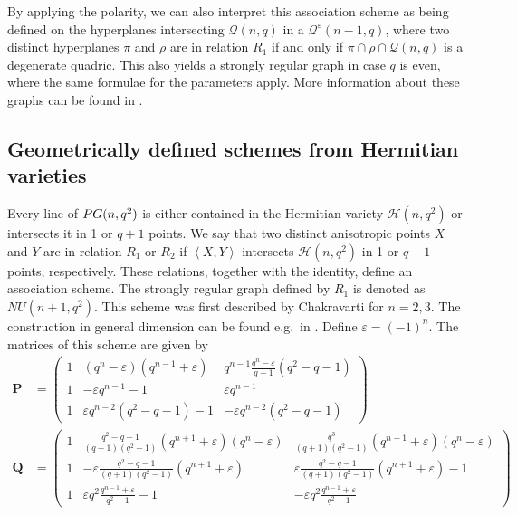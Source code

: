 \documentclass[a4paper]{article}
\theoremstyle{definition}
\newcommand{\eps}{\varepsilon}
\newcommand{\vspan}[1]{\left \langle #1 \right \rangle}
\newcommand{\pg}{\textnormal{PG}}
\newcommand{\mq}{\mathcal Q}
\newcommand{\mh}{\mathcal H}
\begin{document}
By applying the polarity, we can also interpret this association scheme as being defined on the hyperplanes intersecting $\mq(n,q)$ in a $\mq^\eps(n-1,q)$, where two distinct hyperplanes $\pi$ and $\rho$ are in relation $R_1$ if and only if $\pi \cap \rho \cap \mq(n,q)$ is a degenerate quadric.
This also yields a strongly regular graph in case $q$ is even, where the same formulae for the parameters apply.
More information about these graphs can be found in \cite[\S 3.1.4]{brouwervanmaldeghem}.


\subsection{Geometrically defined schemes from Hermitian varieties}
 \label{Sec:NU}

Every line of $\pg(n,q^2)$ is either contained in the Hermitian variety $\mh(n,q^2)$ or intersects it in 1 or $q+1$ points.
We say that two distinct anisotropic points $X$ and $Y$ are in relation $R_1$ or $R_2$ if $\vspan{X,Y}$ intersects $\mh(n,q^2)$ in 1 or $q+1$ points, respectively.
These relations, together with the identity, define an association scheme.
The strongly regular graph defined by $R_1$ is denoted as $NU(n+1,q^2)$.
This scheme was first described by Chakravarti \cite{chakravarti71} for $n = 2,3$.
The construction in general dimension can be found e.g.\ in \cite[\S 3.1.6]{brouwervanmaldeghem}.
Define $\eps = (-1)^n$.
The matrices of this scheme are given by
\begin{align*}
 \mathbf P &= \begin{pmatrix}
  1 & \left( q^n - \eps \right) \left( q^{n-1} + \eps \right) & q^{n-1} \frac{q^n - \eps}{q+1} (q^2-q-1) \\[0.5em]
  1 & - \eps q^{n-1} - 1 & \eps q^{n-1} \\[0.5em]
  1 & \eps q^{n-2} (q^2-q-1) - 1 & -\eps q^{n-2} (q^2-q-1)
 \end{pmatrix} \\
 \mathbf Q & = \begin{pmatrix}
  1 & \frac{q^2-q-1}{(q+1)(q^2-1)}\left( q^{n+1} + \eps \right) \left( q^n - \eps \right) & \frac{q^3}{(q+1)(q^2-1)} \left( q^{n-1} + \eps \right)\left( q^n - \eps \right) \\[0.5em]
  1 & -\eps \frac{q^2-q-1}{(q+1)(q^2-1)}\left( q^{n+1} + \eps \right) & \eps \frac{q^2-q-1}{(q+1)(q^2-1)}\left( q^{n+1} + \eps \right) - 1 \\[0.5em]
  1 & \eps q^2 \frac{q^{n-1} + \eps }{q^2-1} - 1 & - \eps q^2 \frac{q^{n-1} + \eps }{q^2-1}
 \end{pmatrix}
\end{align*}
\end{document}
